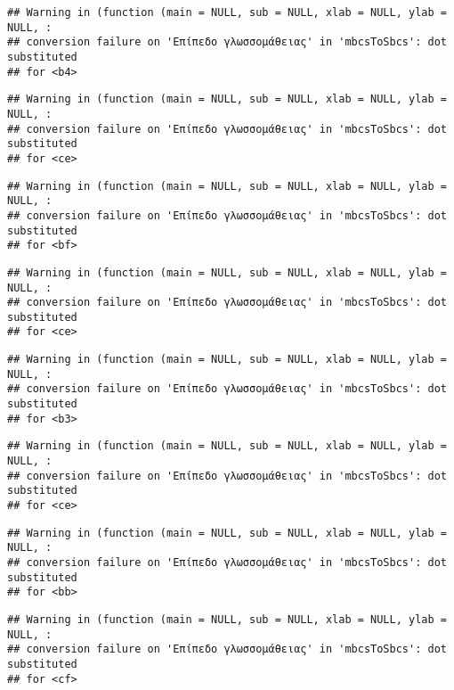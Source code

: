 \documentclass[
]{article}
\begin{document}
\begin{verbatim}
## Warning in (function (main = NULL, sub = NULL, xlab = NULL, ylab = NULL, :
## conversion failure on 'Επίπεδο γλωσσομάθειας' in 'mbcsToSbcs': dot substituted
## for <b4>
\end{verbatim}

\begin{verbatim}
## Warning in (function (main = NULL, sub = NULL, xlab = NULL, ylab = NULL, :
## conversion failure on 'Επίπεδο γλωσσομάθειας' in 'mbcsToSbcs': dot substituted
## for <ce>
\end{verbatim}

\begin{verbatim}
## Warning in (function (main = NULL, sub = NULL, xlab = NULL, ylab = NULL, :
## conversion failure on 'Επίπεδο γλωσσομάθειας' in 'mbcsToSbcs': dot substituted
## for <bf>
\end{verbatim}

\begin{verbatim}
## Warning in (function (main = NULL, sub = NULL, xlab = NULL, ylab = NULL, :
## conversion failure on 'Επίπεδο γλωσσομάθειας' in 'mbcsToSbcs': dot substituted
## for <ce>
\end{verbatim}

\begin{verbatim}
## Warning in (function (main = NULL, sub = NULL, xlab = NULL, ylab = NULL, :
## conversion failure on 'Επίπεδο γλωσσομάθειας' in 'mbcsToSbcs': dot substituted
## for <b3>
\end{verbatim}

\begin{verbatim}
## Warning in (function (main = NULL, sub = NULL, xlab = NULL, ylab = NULL, :
## conversion failure on 'Επίπεδο γλωσσομάθειας' in 'mbcsToSbcs': dot substituted
## for <ce>
\end{verbatim}

\begin{verbatim}
## Warning in (function (main = NULL, sub = NULL, xlab = NULL, ylab = NULL, :
## conversion failure on 'Επίπεδο γλωσσομάθειας' in 'mbcsToSbcs': dot substituted
## for <bb>
\end{verbatim}

\begin{verbatim}
## Warning in (function (main = NULL, sub = NULL, xlab = NULL, ylab = NULL, :
## conversion failure on 'Επίπεδο γλωσσομάθειας' in 'mbcsToSbcs': dot substituted
## for <cf>
\end{verbatim}
\end{document}
